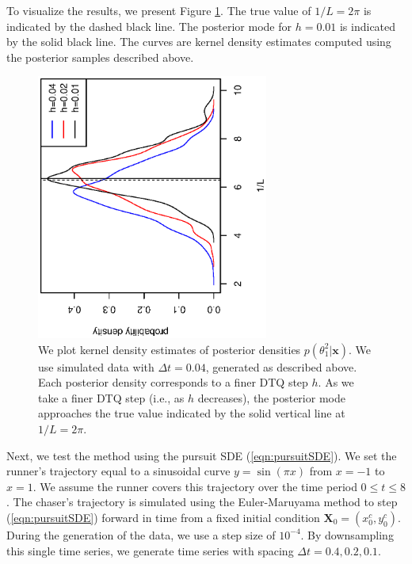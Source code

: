 \documentclass[graybox]{svmult}
\begin{document}
To visualize the results, we present Figure \ref{fig:lcosc}.  The true
value of $1/L = 2 \pi$ is indicated by the dashed black line.  The
posterior mode for $h = 0.01$ is indicated by the solid black line.
The curves are kernel density estimates computed using the posterior
samples described above.
\begin{figure}
\begin{center}
\vspace{-0.55in}
\includegraphics[width=3in,angle=270]{densities.eps}
\end{center}
\vspace{-0.35in}
\caption{We plot kernel density estimates of posterior densities
  $p(\theta_1^2 | \mathbf{x})$.  We use simulated data with  $\Delta t
  = 0.04$, generated as described above.  Each posterior density
  corresponds to a finer DTQ step $h$.  As we take a finer DTQ step
  (i.e., as $h$ decreases), the posterior mode approaches the true
  value indicated by the solid vertical line at $1/L = 2 \pi$.}
\label{fig:lcosc}
\end{figure}

Next, we test the method using the pursuit SDE
(\ref{eqn:pursuitSDE}).  We set the runner's trajectory equal to a
sinusoidal curve $y = \sin (\pi x)$ from $x=-1$ to $x=1$.  We assume
the runner covers this trajectory over the time period $0 \leq t \leq
8$.  The chaser's trajectory is simulated using the Euler-Maruyama
method to step (\ref{eqn:pursuitSDE}) forward in time from a fixed
initial condition $\mathbf{X}_0 = (x^c_0, y^c_0)$.  During the
generation of the data, we use a step size of $10^{-4}$.  By
downsampling this single time series, we generate time series with
spacing $\Delta t = 0.4, 0.2, 0.1$.  
\end{document}
